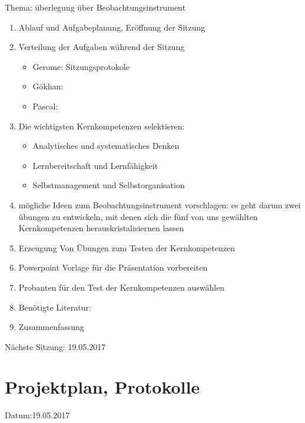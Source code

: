 Thema: überlegung über Beobachtungsinstrument
\begin{enumerate}

\item Ablauf und Aufgabeplanung, Eröffnung der Sitzung 

\item  Verteilung der Aufgaben während der Sitzung
\begin{itemize}
\item Gerome: Sitzungsprotokole
\item Gökhan: 
\item Pascal: 
\end{itemize}


\item  Die wichtigsten Kernkompetenzen selektieren:
\begin{itemize}
\item Analytisches und systematisches Denken
\item Lernbereitschaft und Lernfähigkeit
\item Selbstmanagement und Selbstorganisation 
\end{itemize}

\item mögliche Ideen zum Beobachtungsinstrument vorschlagen: es geht darum zwei übungen zu entwickeln,  mit denen sich die fünf von uns gewählten Kernkompetenzen herauskristalisiernen lassen

\item Erzeugung Von Übungen zum Testen der Kernkompetenzen

\item Powerpoint Vorlage für die Präsentation vorbereiten	

\item Probanten für den Test der Kernkompetenzen auswählen


\item Benötigte Literatur: 

\item Zusammenfassung

\end{enumerate}

Nächste Sitzung: 19.05.2017

\newpage
\section*{Projektplan, Protokolle}

Datum:19.05.2017\\

